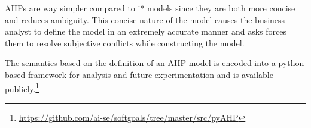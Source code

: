 AHPs are way simpler compared to i* models since they are both more concise and reduces ambiguity. This concise nature of the model causes the business analyst to define the model in an extremely accurate manner and asks forces them to resolve subjective conflicts while constructing the model.

The semantics based on the definition of an AHP model is encoded into a python based framework for analysis and future experimentation and is available publicly.\footnote{\url{https://github.com/ai-se/softgoals/tree/master/src/pyAHP}}